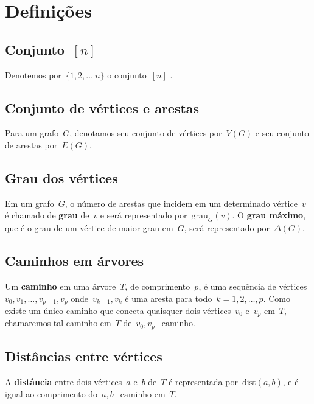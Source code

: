 \documentclass[a4paper,12pt]{article}
\newcommand{\caminho}{\mathrm{-caminho}}
\newcommand{\dist}{\mathrm{dist}}
\newcommand{\grau}{\mathrm{grau}}
\begin{document}
\section{Definições}
	
	\subsection*{Conjunto~$[n]$}
	Denotemos por~$\{1,2,\ldots~n\}$
	o conjunto~$[n]$ .

	\subsection*{Conjunto de vértices e arestas}
	Para um grafo~$G$, denotamos seu
	conjunto de vértices por~$V(G)$ e seu
	conjunto de arestas por~$E(G)$.

	\subsection*{Grau dos vértices}
	Em um grafo~$G$, o número de arestas que incidem em um 
	determinado vértice~$v$ é chamado de 
	\textbf{grau} de~$v$ e será representado
	por~$\grau_G(v)$. O 
	\textbf{grau máximo}, que é o grau de um vértice de
	maior grau em~$G$, será representado por~$\Delta(G)$.

	\subsection*{Caminhos em árvores}
	Um \textbf{caminho} em uma árvore~$T$, de 
	comprimento~$p$, é uma sequência de 
	vértices~$v_0, v_1, \ldots,v_{p-1}, v_p$ 
	onde~$v_{k-1}, v_k$ é uma aresta para 
	todo~${k =1,2, \ldots, p}$. 
	Como existe um único caminho que conecta quaisquer dois 
	vértices~$v_0$ e~$v_p$ em~$T$, chamaremos tal caminho em~$T$ 
	de~$v_0,v_p\caminho$.

	\subsection*{Distâncias entre vértices}
	A \textbf{distância} entre dois vértices~$a$ e~$b$ de~$T$ é 
	representada por~$\dist(a,b)$, e é igual ao comprimento 
	do~$a,b\caminho$ em~$T$.

		

\newpage

\end{document}
